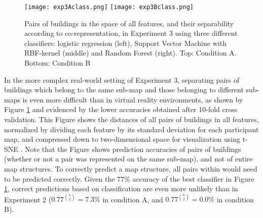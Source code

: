 \begin{figure}[h]
	\centering
	\texttt{[image: exp3Aclass.png]}
	\texttt{[image: exp3Bclass.png]}
	\caption{Pairs of buildings in the space of all features, and their separability according to co-representation, in Experiment 3 using three different classifiers: logistic regression (left), Support Vector Machine with RBF-kernel (middle) and Random Forest (right). Top: Condition A. Bottom: Condition B}
	\label{fig_classify_rl}
\end{figure}

In the more complex real-world setting of Experiment 3, separating pairs of buildings which belong to the same sub-map and those belonging to different sub-maps is even more difficult than in virtual reality environments, as shown by Figure \ref{fig_classify_rl} and evidenced by the lower accuracies obtained after 10-fold cross validation. This Figure shows the distances of all pairs of buildings in all features, normalized by dividing each feature by its standard deviation for each participant map, and compressed down to two-dimensional space for visualization using t-SNE \citep{van2008visualizing}. Note that the Figure shows prediction accuracies of pairs of buildings (whether or not a pair was represented on the same sub-map), and not of entire map structures. To correctly predict a map structure, all pairs within would need to be predicted correctly. Given the $77 \%$ accuracy of the best classifier in Figure \ref{fig_classify_rl}, correct predictions based on classification are even more unlikely than in Experiment 2 ($0.77^{5 \choose 2}=7.3 \%$ in condition A, and $0.77^{8 \choose 2}=0.0 \%$ in condition B).




